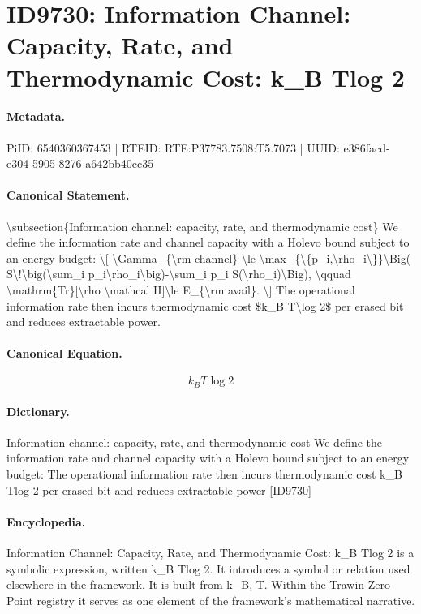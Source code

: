 \section*{ID9730: Information Channel: Capacity, Rate, and Thermodynamic Cost: k\_B Tlog 2}
\paragraph{Metadata.}
PiID: 6540360367453 | RTEID: RTE:P37783.7508:T5.7073 | UUID: e386facd-e304-5905-8276-a642bb40cc35

\paragraph{Canonical Statement.}
\textbackslash{}subsection\{Information channel: capacity, rate, and thermodynamic cost\} We define the information rate and channel capacity with a Holevo bound subject to an energy budget: \textbackslash{}[ \textbackslash{}Gamma\_\{\textbackslash{}rm channel\} \textbackslash{}le \textbackslash{}max\_\{\textbackslash{}\{p\_i,\textbackslash{}rho\_i\textbackslash{}\}\}\textbackslash{}Big( S\textbackslash{}!\textbackslash{}big(\textbackslash{}sum\_i p\_i\textbackslash{}rho\_i\textbackslash{}big)-\textbackslash{}sum\_i p\_i S(\textbackslash{}rho\_i)\textbackslash{}Big), \textbackslash{}qquad \textbackslash{}mathrm\{Tr\}[\textbackslash{}rho \textbackslash{}mathcal H]\textbackslash{}le E\_\{\textbackslash{}rm avail\}. \textbackslash{}] The operational information rate then incurs thermodynamic cost \$k\_B T\textbackslash{}log 2\$ per erased bit and reduces extractable power.

\paragraph{Canonical Equation.}
\[
k_B T\log 2
\]

\paragraph{Dictionary.}
Information channel: capacity, rate, and thermodynamic cost We define the information rate and channel capacity with a Holevo bound subject to an energy budget: The operational information rate then incurs thermodynamic cost k\_B Tlog 2 per erased bit and reduces extractable power [ID9730]

\paragraph{Encyclopedia.}
Information Channel: Capacity, Rate, and Thermodynamic Cost: k\_B Tlog 2 is a symbolic expression, written k\_B Tlog 2. It introduces a symbol or relation used elsewhere in the framework. It is built from k\_B, T. Within the Trawin Zero Point registry it serves as one element of the framework's mathematical narrative.

